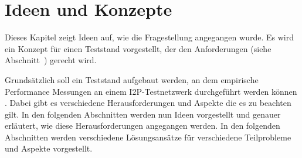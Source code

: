 \chapter{Ideen und Konzepte}
\label{ch:ideen_und_konzepte}

Dieses Kapitel zeigt Ideen auf, wie die Fragestellung angegangen wurde.
Es wird ein Konzept für einen Teststand vorgestellt, der den Anforderungen (siehe Abschnitt~) gerecht wird.






Grundsätzlich soll ein Teststand aufgebaut werden, an dem empirische Performance Messungen an einem I2P-Testnetzwerk durchgeführt werden können .
Dabei gibt es verschiedene Herausforderungen und Aspekte die es zu beachten gilt.
In den folgenden Abschnitten werden nun Ideen vorgestellt und genauer erläutert, wie diese Herausforderungen angegangen werden.
In den folgenden Abschnitten werden verschiedene Lösungsansätze für verschiedene Teilprobleme und Aspekte vorgestellt.


